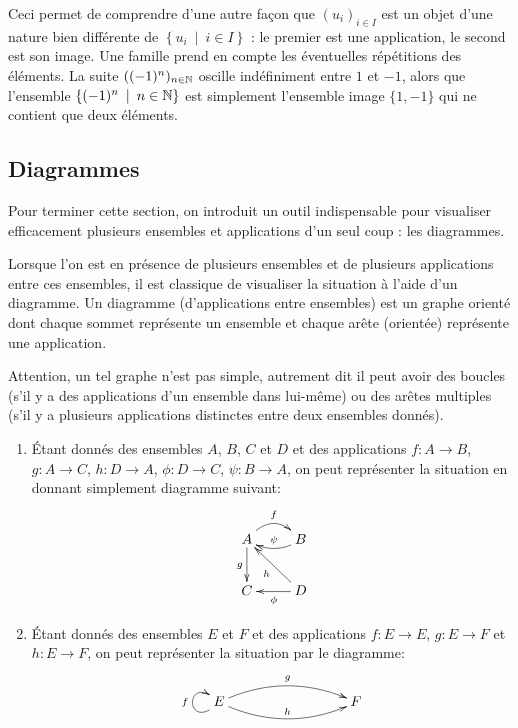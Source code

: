 Ceci permet  de comprendre d'une autre façon que $\left(u_i\right)_{i\in I}$ est un objet d'une nature bien différente de $\left\{u_i\:\mid\: i\in I\right\}$ : le premier est une application, le second est son image. Une famille prend en compte les éventuelles \og répétitions\fg{} des éléments. La suite $((-1)^n)_{n\in \mathbb{N}}$ oscille indéfiniment entre $1$ et $-1$, alors que l'ensemble $\left\{(-1)^n\:\mid\: n\in \N\right\}$ est simplement l'ensemble image $\{1,-1\}$ qui ne contient que deux éléments.

\subsection{Diagrammes}

Pour terminer cette section, on introduit un outil indispensable pour visualiser efficacement plusieurs ensembles et applications d'un seul coup : les diagrammes.

\begin{definition}[Diagramme]
Lorsque l'on est en présence de plusieurs ensembles et de plusieurs applications entre ces ensembles, il est classique de visualiser la situation à l'aide d'un diagramme. Un diagramme (d'applications entre ensembles) est un graphe orienté dont chaque sommet représente un ensemble et chaque arête (orientée) représente une application.
\end{definition}

Attention, un tel graphe n'est pas simple, autrement dit il peut avoir des boucles (s'il y a des applications d'un ensemble dans lui-même) ou des arêtes multiples (s'il y a plusieurs applications distinctes entre deux ensembles donnés).

\begin{exemple}
\begin{enumerate}
\item \'Etant donnés des ensembles $A$, $B$, $C$ et $D$ et des applications $f : A\to B$, $g : A\to C$, $h : D\to A$, $\phi : D\to C$, $\psi : B\to A$, on peut représenter la situation en donnant simplement diagramme suivant:
\[
\xymatrix{
A \ar@/^1pc/[r]^{f} \ar[d]_{g} & B \ar@/^/[l]_{\psi}\\
C & D \ar[ul]^{h} \ar[l]^{\phi}
}
\]
\item \'Etant donnés des ensembles $E$ et $F$ et des applications $f : E\to E$, $g : E\to F$ et $h : E\to F$, on peut représenter la situation par le diagramme:
\[
\xymatrix{
 E \ar@(dl,ul)^{f} \ar@/^1pc/[rrr]^{g} \ar@/_1pc/[rrr]^{h}
& & &  F 
}
\]
\end{enumerate}
\end{exemple}



